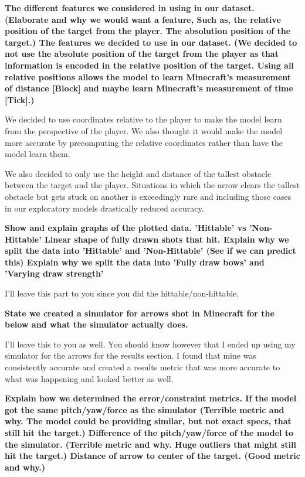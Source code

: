 \documentclass[twoside,twocolumn]{article}
\begin{document}
\textbf{The different features we considered in using in our dataset. (Elaborate and why we would want a feature, Such as, the relative position of the target from the player. The absolution position of the target.)
The features we decided to use in our dataset. (We decided to not use the absolute position of the target from the player as that information is encoded in the relative position of the target. Using all relative positions allows the model to learn Minecraft's measurement of distance [Block] and maybe learn Minecraft's measurement of time [Tick].)}

We decided to use coordinates relative to the player to make the model learn from the perspective of the player. We also thought it would make the model more accurate by precomputing the relative coordinates rather than have the model learn them.

We also decided to only use the height and distance of the tallest obstacle between the target and the player. Situations in which the arrow clears the tallest obstacle but gets stuck on another is exceedingly rare and including those cases in our exploratory models drastically reduced accuracy.

\textbf{Show and explain graphs of the plotted data.
'Hittable' vs 'Non-Hittable'
Linear shape of fully drawn shots that hit.
Explain why we split the data into 'Hittable' and 'Non-Hittable' (See if we can predict this)
Explain why we split the data into 'Fully draw bows' and 'Varying draw strength'}

I'll leave this part to you since you did the hittable/non-hittable.

\textbf{State we created a simulator for arrows shot in Minecraft for the below and what the simulator actually does.}

I'll leave this to you as well. You should know however that I ended up using my simulator for the arrows for the results section. I found that mine was consistently accurate and created a results metric that was more accurate to what was happening and looked better as well.

\textbf{Explain how we determined the error/constraint metrics.
If the model got the same pitch/yaw/force as the simulator (Terrible metric and why. The model could be providing similar, but not exact specs, that still hit the target.)
Difference of the pitch/yaw/force of the model to the simulator. (Terrible metric and why. Huge outliers that might still hit the target.)
Distance of arrow to center of the target. (Good metric and why.)}
\end{document}
